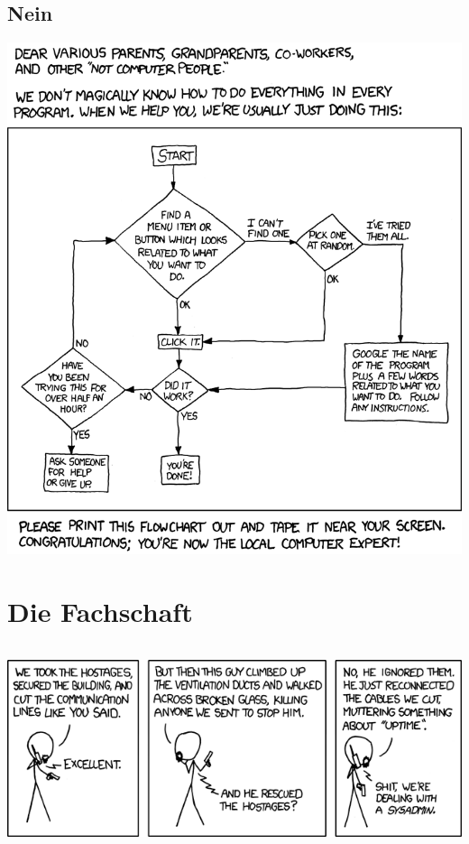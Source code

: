 \documentclass[12pt,a4paper]{scrartcl}
\begin{document}
    \subsection{Nein}
    \includegraphics[width=\textwidth]{comics/tech_support_cheat_sheet.png}
    
    \newpage
    \label{fachschaftsarbeit}
    \section{Die Fachschaft}
    
    \begin{center}
        \includegraphics[height=6cm]{comics/devotion_to_duty.png}
    \end{center}

	
	
\end{document}

